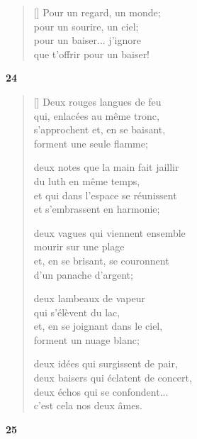 \documentclass[a4paper,12pt]{book}
\begin{document}
\begin{verse}[\versewidth]
  Pour un regard, un monde; \\
  pour un sourire, un ciel; \\
  pour un baiser... j'ignore \\
  que t'offrir pour un baiser!
\end{verse}

\bigskip

\begin{center}
  \textbf{24}
\end{center}

\settowidth{\versewidth}{deux baisers qui à l'unisson éclatent,}

\begin{verse}[\versewidth]
  Deux rouges langues de feu \\
  qui, enlacées au même tronc, \\
  s'approchent et, en se baisant, \\
  forment une seule flamme;

  deux notes que la main fait jaillir \\
  du luth en même temps, \\
  et qui dans l'espace se réunissent \\
  et s'embrassent en harmonie;

  deux vagues qui viennent ensemble \\
  mourir sur une plage \\
  et, en se brisant, se couronnent \\
  d'un panache d'argent;

  deux lambeaux de vapeur \\
  qui s'élèvent du lac, \\
  et, en se joignant dans le ciel, \\
  forment un nuage blanc;

  deux idées qui surgissent de pair, \\
  deux baisers qui éclatent de concert, \\
  deux échos qui se confondent... \\
  c'est cela nos deux âmes.
\end{verse}

\bigskip

\begin{center}
  \textbf{25}
\end{center}
\end{document}
